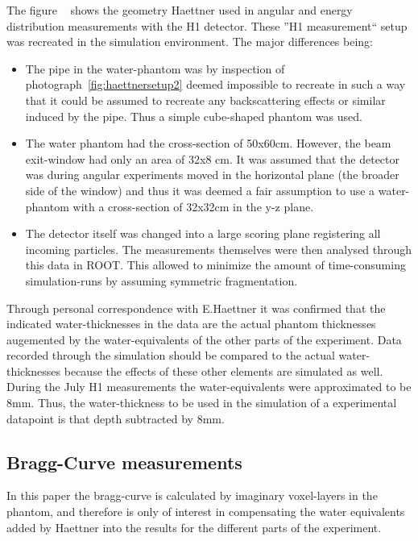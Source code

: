 The figure ~\cite{fig:haettnersetup3} shows the geometry Haettner used in angular and energy distribution measurements with the H1 detector. These ''H1 measurement`` setup was recreated in the simulation environment. The major differences being:
\begin{itemize}
\item The pipe in the water-phantom was by inspection of photograph~\ref{fig:haettnersetup2} deemed impossible to recreate in such a way that it could be assumed to recreate any backscattering effects or similar induced by the pipe. Thus a simple cube-shaped phantom was used.
\item The water phantom had the cross-section of 50x60cm. However, the beam exit-window had only an area of 32x8 cm. It was assumed that the detector was during angular experiments moved in the horizontal plane (the broader side of the window) and thus it was deemed a fair assumption to use a water-phantom with a cross-section of 32x32cm in the y-z plane. 
\item The detector itself was changed into a large scoring plane registering all incoming particles. The measurements themselves were then analysed through this data in ROOT. This allowed to minimize the amount of time-consuming simulation-runs by assuming symmetric fragmentation.
\end{itemize}

Through personal correspondence with E.Haettner it was confirmed that the indicated water-thicknesses in the data are the actual phantom thicknesses augemented by the water-equivalents of the other parts of the experiment. Data recorded through the simulation should be compared to the actual water-thicknesses because the effects of these other elements are simulated as well. During the July H1 measurements the water-equivalents were approximated to be 8mm. Thus, the water-thickness to be used in the simulation of a experimental datapoint is that depth subtracted by 8mm. %

\subsection{Bragg-Curve measurements}
In this paper the bragg-curve is calculated by imaginary voxel-layers in the phantom, and therefore is only of interest in compensating the water equivalents added by Haettner into the results for the different parts of the experiment.

